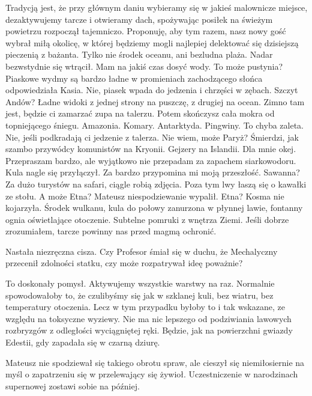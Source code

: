 \begin{dialogue}
\ds{} Tradycją jest, że przy głównym daniu wybieramy się w jakieś malownicze miejsce, dezaktywujemy tarcze i otwieramy dach, spożywając posiłek na świeżym powietrzu \dm{}
rozpoczął tajemniczo. \dm{} Proponuję, aby tym razem, nasz nowy gość wybrał miłą okolicę, w której będziemy mogli najlepiej delektować się dzisiejszą pieczenią z bażanta.
\ds{} Tylko nie środek oceanu, ani bezludna plaża. \dm{} Nadar bezwstydnie się wtrącił. \dm{} Mam na jakiś czas dosyć wody. 
\ds{} To może pustynia? Piaskowe wydmy są bardzo ładne w promieniach zachodzącego słońca \dm{} odpowiedziała Kasia.
\ds{} Nie, piasek wpada do jedzenia i chrzęści w zębach.
\ds{} Szczyt Andów? Ładne widoki z jednej strony na puszczę, z drugiej na ocean.
\ds{} Zimno tam jest, będzie ci zamarzać zupa na talerzu. Potem skończysz cała mokra od topniejącego śniegu.
\ds{} Amazonia.
\ds{} Komary.
\ds{} Antarktyda.
\ds{} Pingwiny.
\ds{} To chyba zaleta.
\ds{} Nie, jeśli podkradają ci jedzenie z talerza.
\ds{} Nie wiem, może Paryż?
\ds{} Śmierdzi, jak szambo przywódcy komunistów na Kryonii.
\ds{} Gejzery na Islandii.
\ds{} Dla mnie okej.
\ds{} Przepraszam bardzo, ale wyjątkowo nie przepadam za zapachem siarkowodoru. \dm{} Kula nagle się przyłączył. \dm{} Za bardzo przypomina mi moją przeszłość.
\ds{} Sawanna?
\ds{} Za dużo turystów na safari, ciągle robią zdjęcia. Poza tym lwy łaszą się o kawałki ze stołu.
\ds{} A może Etna? \dm{} Mateusz niespodziewanie wypalił.
\ds{} Etna? \dm{} Kosma nie kojarzyła.
\ds{} Środek wulkanu, kula do połowy zanurzona w płynnej lawie, fontanny ognia oświetlające otoczenie. Subtelne pomruki z wnętrza Ziemi.
Jeśli dobrze zrozumiałem, tarcze powinny nas przed magmą ochronić.
\end{dialogue}

Nastała niezręczna cisza. Czy Profesor śmiał się w duchu, że Mechalyczny przecenił zdolności statku, czy może rozpatrywał ideę poważnie?

\begin{dialogue}
\ds{} To doskonały pomysł. Aktywujemy wszystkie warstwy na raz. Normalnie spowodowałoby to, że czulibyśmy się 
jak w szklanej kuli, bez wiatru, bez temperatury otoczenia. Lecz w tym przypadku byłoby to i tak wskazane, ze względu na toksyczne wyziewy.
Nie ma nic lepszego od podziwiania lawowych rozbryzgów z odległości wyciągniętej ręki. Będzie, jak na powierzchni gwiazdy Edestii, gdy zapadała się w czarną dziurę.
\end{dialogue}

Mateusz nie spodziewał się takiego obrotu spraw, ale cieszył się niemiłosiernie na myśl o zapatrzeniu się w przelewający się żywioł.
Uczestniczenie w narodzinach supernowej zostawi sobie na później.

